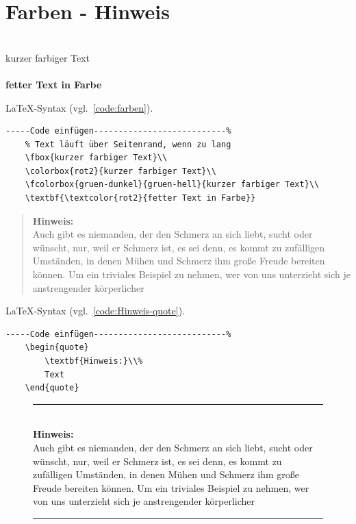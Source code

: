 \clearpage
\section{Farben - Hinweis}

\\
\colorbox{rot2}{kurzer farbiger Text}\\
\\

\textbf{\textcolor{rot2}{fetter Text in Farbe}}

\LaTeX -Syntax (vgl.~\ref{code:farben}). 
\begin{lstlisting}[caption={Farben},label={code:farben},language=TeX% C, TeX, Bash, Python
]-----Code einfügen---------------------------%
	% Text läuft über Seitenrand, wenn zu lang
	\fbox{kurzer farbiger Text}\\
	\colorbox{rot2}{kurzer farbiger Text}\\
	\fcolorbox{gruen-dunkel}{gruen-hell}{kurzer farbiger Text}\\	
	\textbf{\textcolor{rot2}{fetter Text in Farbe}}
\end{lstlisting}

\begin{quote}
	\textbf{Hinweis:}\\%
	Auch gibt es niemanden, der den Schmerz an sich liebt, sucht oder wünscht, nur, weil er Schmerz ist, es sei denn, es kommt zu zufälligen Umständen, in denen Mühen und Schmerz ihm große Freude bereiten können. Um ein triviales Beispiel zu nehmen, wer von uns unterzieht sich je anstrengender körperlicher
\end{quote}

\LaTeX -Syntax (vgl.~\ref{code:Hinweis-quote}). 

\begin{lstlisting}[caption={Hinweis in quote},label={code:Hinweis-quote},language=TeX% C, TeX, Bash, Python
]-----Code einfügen---------------------------%
	\begin{quote}
		\textbf{Hinweis:}\\%
		Text
	\end{quote}
\end{lstlisting}

\clearpage
\begin{figure}[hb]
	\centering
	\begin{minipage}[b]{0.88\textwidth} 
		\color{blau5}\rule{\textwidth}{2pt}\\%
		\textbf{Hinweis:}\\
		Auch gibt es niemanden, der den Schmerz an sich liebt, sucht oder wünscht, nur, weil er Schmerz ist, es sei denn, es kommt zu zufälligen Umständen, in denen Mühen und Schmerz ihm große Freude bereiten können. Um ein triviales Beispiel zu nehmen, wer von uns unterzieht sich je anstrengender körperlicher
		\\ \rule{\textwidth}{2pt}%
	\end{minipage}
\end{figure}

